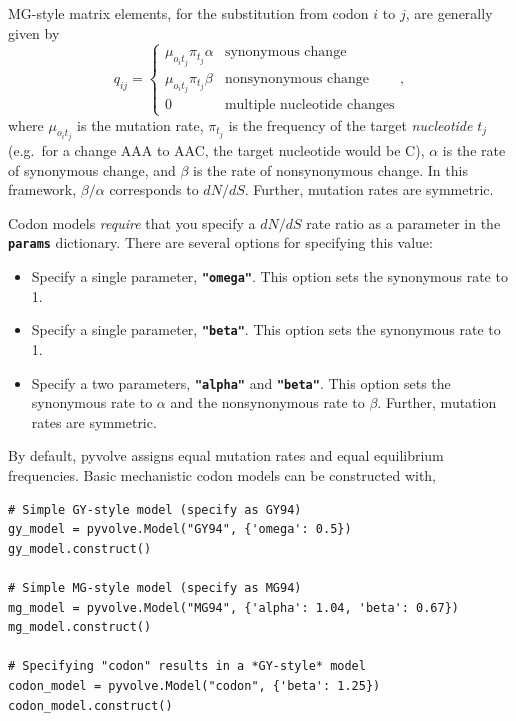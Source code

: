 \documentclass{article}
\newcommand{\code}[1]{\textbf{\texttt{\small{#1}}}}
\begin{document}
MG-style \citep{MG94} matrix elements, for the substitution from codon $i$ to $j$, are generally given by 
\begin{equation}\label{eq:MGstyle}
q_{ij} = \left\{ 
\begin{array}{rl}
\mu_{o_it_j}\pi_{t_j} \alpha         &\text{synonymous change} \\
\mu_{o_it_j}\pi_{t_j} \beta  &\text{nonsynonymous change} \\
0                             &\text{multiple nucleotide changes}       
\end{array} \right. ,
\end{equation}
where $\mu_{o_it_j}$ is the mutation rate, $\pi_{t_j}$ is the frequency of the target \emph{nucleotide} $t_j$ (e.g.\ for a change AAA to AAC, the target nucleotide would be C), $\alpha$ is the rate of synonymous change, and $\beta$ is the rate of nonsynonymous change. In this framework, $\beta / \alpha$ corresponds to $dN/dS$. Further, mutation rates are symmetric.

Codon models \emph{require} that you specify a $dN/dS$ rate ratio as a parameter in the \code{params} dictionary. There are several options for specifying this value:
\begin{itemize}
	\item Specify a single parameter, \code{"omega"}. This option sets the synonymous rate to 1.
	\item Specify a single parameter, \code{"beta"}. This option sets the synonymous rate to 1.
	\item Specify a two parameters, \code{"alpha"} and \code{"beta"}. This option sets the synonymous rate to $\alpha$ and the nonsynonymous rate to $\beta$. Further, mutation rates are symmetric.
\end{itemize}

By default, pyvolve assigns equal mutation rates and equal equilibrium frequencies. Basic mechanistic codon models can be constructed with,
\begin{lstlisting}
# Simple GY-style model (specify as GY94)
gy_model = pyvolve.Model("GY94", {'omega': 0.5})
gy_model.construct()

# Simple MG-style model (specify as MG94)
mg_model = pyvolve.Model("MG94", {'alpha': 1.04, 'beta': 0.67})
mg_model.construct()

# Specifying "codon" results in a *GY-style* model
codon_model = pyvolve.Model("codon", {'beta': 1.25})
codon_model.construct()
\end{lstlisting}
\end{document}
